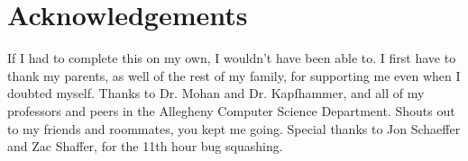 \chapter*{Acknowledgements}

If I had to complete this on my own, I wouldn't have been able to. I first have
to thank my parents, as well of the rest of my family, for supporting me even when
I doubted myself. Thanks to Dr. Mohan and Dr. Kapfhammer, and all of my professors
and peers in the Allegheny Computer Science Department. Shouts out to my friends
and roommates, you kept me going. Special thanks to Jon Schaeffer and Zac Shaffer,
for the 11th hour bug squashing.
